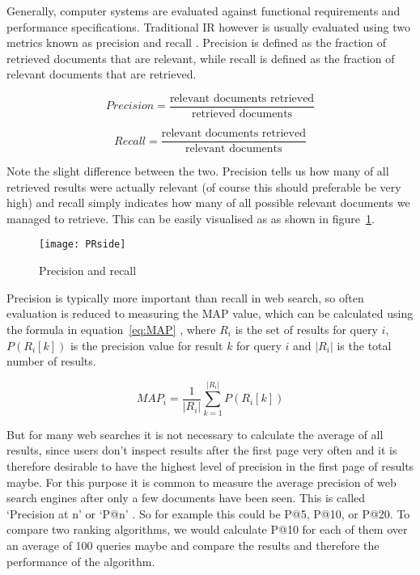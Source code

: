 Generally, computer systems are evaluated against functional requirements and performance specifications. Traditional \acf{IR} however is usually evaluated using two metrics known as precision and recall \autocite{Baeza-Yates2011}. Precision is defined as the fraction of retrieved documents that are relevant, while recall is defined as the fraction of relevant documents that are retrieved.

\begin{equation}
  Precision = \frac{\text{relevant documents retrieved}}{\text{retrieved documents}}
  \label{eq:precision}
\end{equation}

\begin{equation}
  Recall = \frac{\text{relevant documents retrieved}}{\text{relevant documents}}
\label{eq:recall}
\end{equation}

Note the slight difference between the two. Precision tells us how many of all retrieved results were actually relevant (of course this should preferable be very high) and recall simply indicates how many of all possible relevant documents we managed to retrieve. This can be easily visualised as as shown in figure~\ref{fig:PR}.

\begin{figure}[!htbp]
  \centering
  \texttt{[image: PRside]}
  \caption[Precision and recall]{Precision and recall \autocite{Wikimedia2014}}
\label{fig:PR}
\end{figure}

Precision is typically more important than recall in web search, so often evaluation is reduced to measuring the \acf{MAP} value\marginpar{$\bm{\Sigma}$~\ref{eq:MAP}}, which can be calculated using the formula in equation~\ref{eq:MAP} \autocite{Baeza-Yates2011}, where $R_i$ is the set of results for query $i$, $P(R_i[k])$ is the precision value for result $k$ for query $i$ and $|R_i|$ is the total number of results.

\begin{equation}
  MAP_i = \frac{1}{|R_i|} \sum_{k=1}^{|R_i|} P(R_i[k])
\label{eq:MAP}
\end{equation}

But for many web searches it is not necessary to calculate the average of all results, since users don't inspect results after the first page very often and it is therefore desirable to have the highest level of precision in the first page of results maybe. For this purpose it is common to measure the average precision of web search engines after only a few documents have been seen. This is called `Precision at n' or `P@n' \autocite{Baeza-Yates2011}. So for example this could be P@5, P@10, or P@20. To compare two ranking algorithms, we would calculate P@10 for each of them over an average of 100 queries maybe and compare the results and therefore the performance of the algorithm.

